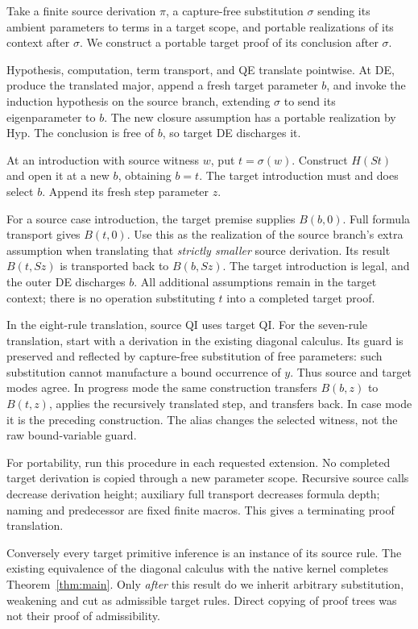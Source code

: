 \documentclass[11pt]{article}
\begin{document}
Take a finite source derivation \(\pi\), a capture-free substitution
\(\sigma\) sending its ambient parameters to terms in a target scope,
and portable realizations of its context after \(\sigma\).
We construct a portable target proof of its conclusion after \(\sigma\).

Hypothesis, computation, term transport, and QE translate pointwise.
At DE, produce the translated major, append a fresh target parameter \(b\),
and invoke the induction hypothesis on the source branch, extending
\(\sigma\) to send its eigenparameter to \(b\). The new closure assumption
has a portable realization by Hyp. The conclusion is free of \(b\), so
target DE discharges it.

At an introduction with source witness \(w\), put \(t=\sigma(w)\).
Construct \(H(St)\) and open it at a new \(b\), obtaining \(b=t\).
The target introduction must and does select \(b\). Append its fresh
step parameter \(z\).

For a source case introduction, the target premise supplies \(B(b,0)\).
Full formula transport gives \(B(t,0)\). Use this as the realization of
the source branch's extra assumption when translating that \emph{strictly
smaller} source derivation. Its result \(B(t,Sz)\) is transported back to
\(B(b,Sz)\). The target introduction is legal, and the outer DE discharges
\(b\). All additional assumptions remain in the target context; there is
no operation substituting \(t\) into a completed target proof.

In the eight-rule translation, source QI uses target QI.
For the seven-rule translation, start with a derivation in the existing
diagonal calculus. Its guard is preserved and reflected by capture-free
substitution of free parameters: such substitution cannot manufacture a
bound occurrence of \(y\). Thus source and target modes agree.
In progress mode the same construction transfers \(B(b,z)\) to
\(B(t,z)\), applies the recursively translated step, and transfers back.
In case mode it is the preceding construction. The alias changes the
selected witness, not the raw bound-variable guard.

For portability, run this procedure in each requested extension.
No completed target derivation is copied through a new parameter scope.
Recursive source calls decrease derivation height; auxiliary full transport
decreases formula depth; naming and predecessor are fixed finite macros.
This gives a terminating proof translation.

Conversely every target primitive inference is an instance of its source
rule. The existing equivalence of the diagonal calculus with the native
kernel \cite{diag} completes Theorem~\ref{thm:main}.
Only \emph{after} this result do we inherit arbitrary substitution,
weakening and cut as admissible target rules. Direct copying of proof trees
was not their proof of admissibility.
\end{document}
